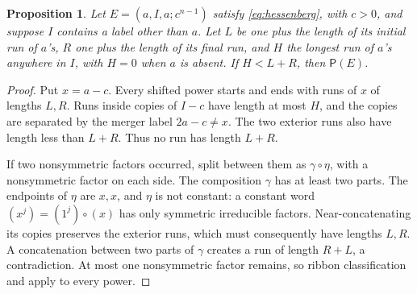 \documentclass[11pt,a4paper]{amsart}
\numberwithin{equation}{section}
\theoremstyle{plain}
\newtheorem{proposition}[theorem]{Proposition}
\theoremstyle{definition}
\begin{document}
\begin{proposition}\label{prop:boundary-runs}
Let \(E=(a,I,a;c^{n-1})\) satisfy \eqref{eq:hessenberg}, with \(c>0\), and suppose \(I\) contains a label other than \(a\).  Let \(L\) be one plus the length of its initial run of \(a\)'s, \(R\) one plus the length of its final run, and \(H\) the longest run of \(a\)'s anywhere in \(I\), with \(H=0\) when \(a\) is absent.  If \(H<L+R\), then \(\mathsf P(E)\).
\end{proposition}
\begin{proof}
Put \(x=a-c\).  Every shifted power starts and ends with runs of \(x\) of lengths \(L,R\).  Runs inside copies of \(I-c\) have length at most \(H\), and the copies are separated by the merger label \(2a-c\ne x\).  The two exterior runs also have length less than \(L+R\).  Thus no run has length \(L+R\).

If two nonsymmetric factors occurred, split between them as \(\gamma\circ\eta\), with a nonsymmetric factor on each side.  The composition \(\gamma\) has at least two parts.  The endpoints of \(\eta\) are \(x,x\), and \(\eta\) is not constant: a constant word \((x^j)=(1^j)\circ(x)\) has only symmetric irreducible factors.  Near-concatenating its copies preserves the exterior runs, which must consequently have lengths \(L,R\).  A concatenation between two parts of \(\gamma\) creates a run of length \(R+L\), a contradiction.  At most one nonsymmetric factor remains, so ribbon classification and  apply to every power.
\end{proof}
\end{document}
